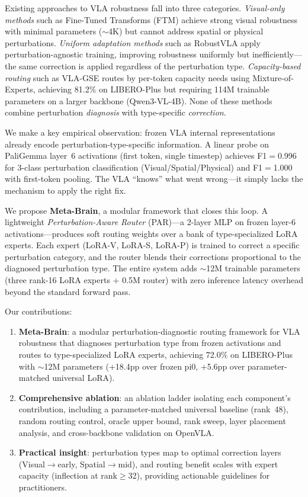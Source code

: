 \documentclass[10pt,twocolumn]{article}
\begin{document}
Existing approaches to VLA robustness fall into three categories.
\emph{Visual-only methods} such as Fine-Tuned Transforms (FTM) achieve strong visual robustness with minimal parameters (${\sim}$4K) but cannot address spatial or physical perturbations.
\emph{Uniform adaptation methods} such as RobustVLA apply perturbation-agnostic training, improving robustness uniformly but inefficiently---the same correction is applied regardless of the perturbation type.
\emph{Capacity-based routing} such as VLA-GSE routes by per-token capacity needs using Mixture-of-Experts, achieving 81.2\% on LIBERO-Plus but requiring 114M trainable parameters on a larger backbone (Qwen3-VL-4B).
None of these methods combine perturbation \emph{diagnosis} with type-specific \emph{correction}.

We make a key empirical observation: frozen VLA internal representations already encode perturbation-type-specific information.
A linear probe on PaliGemma layer~6 activations (first token, single timestep) achieves F1$=$0.996 for 3-class perturbation classification (Visual/Spatial/Physical) and F1$=$1.000 with first-token pooling.
The VLA ``knows'' what went wrong---it simply lacks the mechanism to apply the right fix.

We propose \textbf{Meta-Brain}, a modular framework that closes this loop.
A lightweight \emph{Perturbation-Aware Router} (PAR)---a 2-layer MLP on frozen layer-6 activations---produces soft routing weights over a bank of type-specialized LoRA experts.
Each expert (LoRA-V, LoRA-S, LoRA-P) is trained to correct a specific perturbation category, and the router blends their corrections proportional to the diagnosed perturbation type.
The entire system adds ${\sim}$12M trainable parameters (three rank-16 LoRA experts $+$ 0.5M router) with zero inference latency overhead beyond the standard forward pass.

Our contributions:
\begin{enumerate}
    \item \textbf{Meta-Brain}: a modular perturbation-diagnostic routing framework for VLA robustness that diagnoses perturbation type from frozen activations and routes to type-specialized LoRA experts, achieving 72.0\% on LIBERO-Plus with ${\sim}$12M parameters (+18.4pp over frozen pi0, +5.6pp over parameter-matched universal LoRA).
    \item \textbf{Comprehensive ablation}: an ablation ladder isolating each component's contribution, including a parameter-matched universal baseline (rank~48), random routing control, oracle upper bound, rank sweep, layer placement analysis, and cross-backbone validation on OpenVLA.
    \item \textbf{Practical insight}: perturbation types map to optimal correction layers (Visual$\to$early, Spatial$\to$mid), and routing benefit scales with expert capacity (inflection at rank${\geq}$32), providing actionable guidelines for practitioners.
\end{enumerate}
\end{document}
